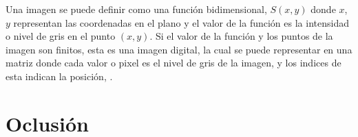 Una imagen se puede definir como una función bidimensional, $S(x,y)$ donde $x$, $y$ representan las coordenadas en el plano y el valor de la función es la intensidad o nivel de gris en el punto $(x,y)$. 
Si el valor de la función y los puntos de la imagen son finitos, esta es una imagen digital, la cual se puede representar en una matriz donde cada valor o pixel es el nivel de gris de la imagen, y los indices de esta indican la posición, \citep{Gonzalez2002}. 

\section{Oclusión}\label{OclusionDef}

\newpage
